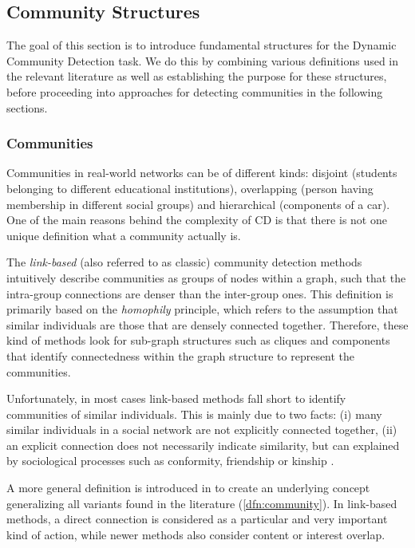 \documentclass[
acmsmall,
nonacm,
screen,
acmthm]{acmart}
\begin{document}
\hypertarget{community-structures}{%
\subsection{Community Structures}\label{community-structures}}

The goal of this section is to introduce fundamental structures for the
Dynamic Community Detection task. We do this by combining various
definitions used in the relevant literature as well as establishing the
purpose for these structures, before proceeding into approaches for
detecting communities in the following sections.

\hypertarget{communities}{%
\subsubsection{Communities}\label{communities}}

Communities in real-world networks can be of different kinds: disjoint
(students belonging to different educational institutions), overlapping
(person having membership in different social groups) and hierarchical
(components of a car). One of the main reasons behind the complexity of
CD is that there is not one unique definition what a community actually
is.

The \emph{link-based} (also referred to as classic) community detection
methods intuitively describe communities as groups of nodes within a
graph, such that the intra-group connections are denser than the
inter-group ones. This definition is primarily based on the
\emph{homophily} principle, which refers to the assumption that similar
individuals are those that are densely connected together. Therefore,
these kind of methods look for sub-graph structures such as cliques and
components that identify connectedness within the graph structure to
represent the communities.

Unfortunately, in most cases link-based methods fall short to identify
communities of similar individuals. This is mainly due to two facts: (i)
many similar individuals in a social network are not explicitly
connected together, (ii) an explicit connection does not necessarily
indicate similarity, but can explained by sociological processes such as
conformity, friendship or kinship
\citep{diehlRelationshipIdentificationSocial2007, faniUserCommunityDetection2020}.

A more general definition is introduced in
\citep{cosciaClassificationCommunityDiscovery2011} to create an
underlying concept generalizing all variants found in the literature
(\cref{dfn:community}). In link-based methods, a direct connection is
considered as a particular and very important kind of action, while
newer methods also consider content or interest overlap.
\end{document}
